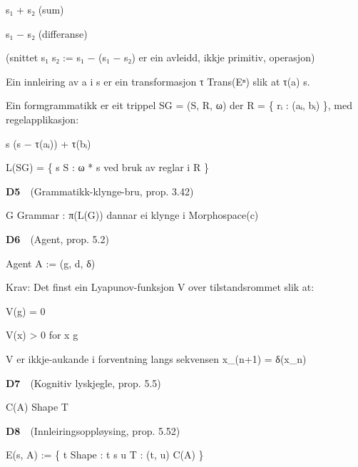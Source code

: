 \documentclass[10pt]{article}
\begin{document}
s₁ + s₂ (sum)




s₁ − s₂ (differanse)




(snittet s₁  s₂ := s₁ − (s₁ − s₂) er ein avleidd, ikkje primitiv, operasjon)




Ein innleiring av a i s er ein transformasjon τ  Trans(Eⁿ) slik at τ(a)  s.




Ein formgrammatikk er eit trippel SG = (S, R, ω) der R = \{ rᵢ : (aᵢ, bᵢ) \}, med regelapplikasjon:




s  (s − τ(aᵢ)) + τ(bᵢ)




L(SG) = \{ s  S : ω * s ved bruk av reglar i R \}




\noindent\textbf{D5}~~(Grammatikk-klynge-bru, prop. 3.42)




G  Grammar : π(L(G)) dannar ei klynge i Morphospace(c)




\noindent\textbf{D6}~~(Agent, prop. 5.2)




Agent A := (g, d, δ)




Krav: Det finst ein Lyapunov-funksjon V over tilstandsrommet slik at:




V(g) = 0




V(x) > 0 for x  g




V er ikkje-aukande i forventning langs sekvensen x\_(n+1) = δ(x\_n)




\noindent\textbf{D7}~~(Kognitiv lyskjegle, prop. 5.5)




C(A)  Shape  T




\noindent\textbf{D8}~~(Innleiringsoppløysing, prop. 5.52)




E(s, A) := \{ t  Shape : t  s  u  T : (t, u)  C(A) \}
\end{document}
